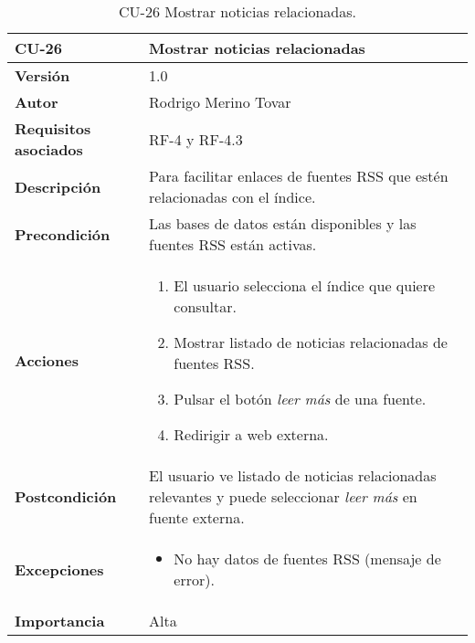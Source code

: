 \begin{table}[p]
	\centering
	\begin{tabularx}{\linewidth}{ p{} p{} }
		\toprule
		\textbf{CU-26}    & \textbf{Mostrar noticias relacionadas}\\
		\toprule
		\textbf{Versión}              & 1.0    \\
		\textbf{Autor}                & Rodrigo Merino Tovar \\
		\textbf{Requisitos asociados} & RF-4 y RF-4.3 \\
		\textbf{Descripción}          & Para facilitar enlaces de fuentes RSS que estén relacionadas con el índice.\\
		\textbf{Precondición}         & Las bases de datos están disponibles y las fuentes RSS están activas.  \\
		\textbf{Acciones}             &
		\begin{enumerate}
			\def\labelenumi{\arabic{enumi}.}
			\tightlist 
			\item El usuario selecciona el índice que quiere consultar. 
			\item Mostrar listado de noticias relacionadas de fuentes RSS.
			\item Pulsar el botón \emph{leer más} de una fuente.
			\item Redirigir a web externa. 
		\end{enumerate}\\
		\textbf{Postcondición}        & El usuario ve listado de noticias relacionadas relevantes y puede seleccionar \emph{leer más} en fuente externa. \\
		\textbf{Excepciones}          & 
		\begin{itemize}
			\tightlist
			\item No hay datos de fuentes RSS (mensaje de error).
		\end{itemize} \\
		\textbf{Importancia}          & Alta \\
		\bottomrule
	\end{tabularx}
	\caption{CU-26 Mostrar noticias relacionadas.}
\end{table}



